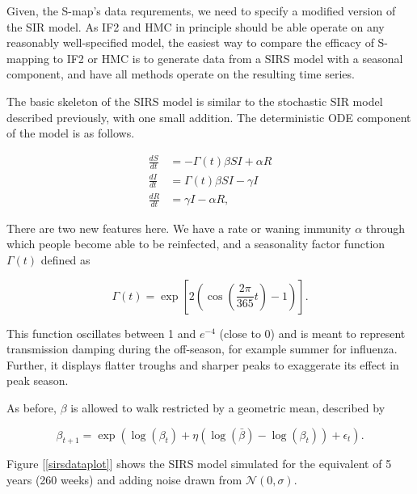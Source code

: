 	Given, the S-map's data requrements, we need to specify a modified version of the SIR model. As IF2 and HMC in principle should be able operate on any reasonably well-specified model, the easiest way to compare the efficacy of S-mapping to IF2 or HMC is to generate data from a SIRS model with a seasonal component, and have all methods operate on the resulting time series.

	The basic skeleton of the SIRS model is similar to the stochastic SIR model described previously, with one small addition. The deterministic ODE component of the model is as follows.

	\begin{equation}
		\begin{aligned}
			\frac{dS}{dt} & = - \Gamma(t) \beta S I + \alpha R \\
			\frac{dI}{dt} & = \Gamma(t) \beta S I - \gamma I \\
			\frac{dR}{dt} & = \gamma I - \alpha R,
		\end{aligned}
	\end{equation}

	There are two new features here. We have a rate or waning immunity $\alpha$ through which people become able to be reinfected, and a seasonality factor function $\Gamma (t)$ defined as

	\begin{equation}
		\Gamma(t) = \exp \left[ 2 \left( \cos \left(  \frac{2 \pi}{365} t \right) - 1 \right) \right].
	\end{equation}

	This function oscillates between 1 and $e^{-4}$ (close to 0) and is meant to represent transmission damping during the off-season, for example summer for influenza. Further, it displays flatter troughs and sharper peaks to exaggerate its effect in peak season.

	As before, $\beta$ is allowed to walk restricted by a geometric mean, described by

	\begin{equation}
		\beta_{t+1} = \exp \left( \log(\beta_{t}) + \eta (\log(\bar{\beta}) - \log(\beta_{t})) + \epsilon_{t} \right).
	\end{equation}

	Figure [\ref{sirsdataplot}] shows the SIRS model simulated for the equivalent of 5 years (260 weeks) and adding noise drawn from $\mathcal{N}(0,\sigma)$.

